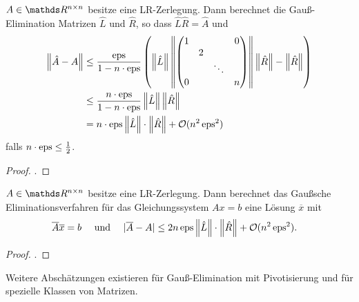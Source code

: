 \begin{Satze}
  $A \in \R^{n\times n}$ besitze eine LR-Zerlegung. Dann berechnet die
  Gauß-Elimination Matrizen $\hat{L}$ und $\hat{R}$,
  so dass $\hat{L}\hat{R} =\hat{A}$
  und
  \begin{align*}
    \nn[\hat{A}-A] 
    & \leq 
      \frac{\Eps}{1-n \cdot \Eps}
      \left( \nn[\hat{L}]
      \nn[{\begin{pmatrix}
          1 && & 0\\
          &2\\
          &&\ddots \\
          0&&& n\\
        \end{pmatrix}}]
    \nn[\hat{R}]-\nn[\hat{R}]
    \right)\\
    & \leq  \frac{n\cdot \Eps}{1-n\cdot \Eps}\nn[\hat{L}]\nn[\hat{R}] \\
    & = n\cdot \Eps \nn[\hat{L}]\cdot \nn[\hat{R}] 
      + \mathcal{O}( n^2 \Eps^2)
  \end{align*}
  falls $n\cdot \Eps \leq \frac{1}{2}$.
\end{Satze}
\begin{proof}
  \cite[siehe][]{stoerbulirsch}.
\end{proof}


\begin{Satze}[Sautter 1971]
  $ A \in \R^{n\times n}$ besitze eine LR-Zerlegung.  Dann berechnet das
  Gaußsche Eliminationsverfahren für das Gleichungssystem
  $Ax = b$ eine Lösung $\overline{x}$ mit 
  \begin{align*} 
    \overline{A} \overline{x} &= b
    &\text{ und }& 
    & |\overline{A}-A|  
    &\leq  2n\Eps
      \nn[\hat{L}]\cdot\nn[\hat{R}]+\mathcal{O}(n^2\Eps^2).
  \end{align*}
\end{Satze}

\begin{proof}
  \cite[siehe][]{deuflhardhohmann}.
\end{proof}

Weitere Abschätzungen existieren für Gauß-Elimination mit 
Pivotisierung und für spezielle Klassen von Matrizen.

